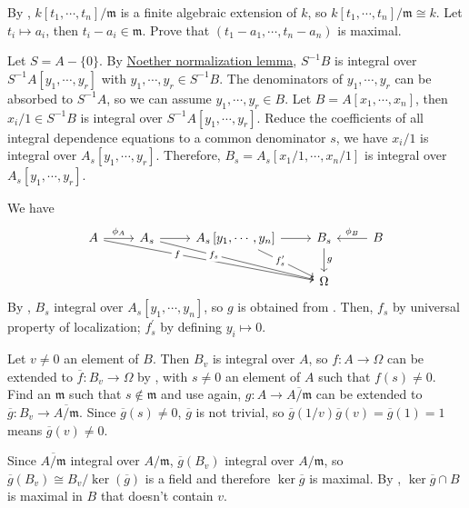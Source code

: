 \begin{exercise}\label{ex5.19}
	By , $k\left[t_1,\cdots,t_n\right]/\mathfrak{m}$ is a finite algebraic extension of $k$, so $k\left[t_1,\cdots,t_n\right]/\mathfrak{m}\cong k$. Let $t_i\mapsto a_i$, then $t_i-a_i\in\mathfrak{m}$. Prove that $\left(t_1-a_1,\cdots,t_n-a_n\right)$ is maximal.
\end{exercise}

\begin{exercise}\label{ex5.20}
	Let $S=A-\{0\}$. By \hyperref[noethernormalization]{Noether normalization lemma}, $S^{-1}B$ is integral over $S^{-1}A\left[y_1,\cdots,y_r\right]$ with $y_1,\cdots,y_r\in S^{-1}B$. The denominators of $y_1,\cdots,y_r$ can be absorbed to $S^{-1}A$, so we can assume $y_1,\cdots,y_r\in B$. Let $B=A\left[x_1,\cdots,x_n\right]$, then $x_i/1\in S^{-1}B$ is integral over $S^{-1}A\left[y_1,\cdots,y_r\right]$. Reduce the coefficients of all integral dependence equations to a common denominator $s$, we have $x_i/1$ is integral over $A_s\left[y_1,\cdots,y_r\right]$. Therefore, $B_s=A_s\left[x_1/1,\cdots,x_n/1\right]$ is integral over $A_s\left[y_1,\cdots,y_r\right]$.
\end{exercise}

\begin{exercise}\label{ex5.21}
	We have
	\begin{equation*}
		\begin{tikzcd}
			A\arrow[r,"\phi_A"]\arrow[drrr,"f"{description,pos=0.35}]&A_s\arrow[r]\arrow[drr,"f_s"{description,pos=0.35}]&A_s\left[y_1,\cdots,y_n\right]\arrow[r]\arrow[dr,"f_s^\prime"{description,pos=0.4}]
			&B_s\arrow[d,"g"]&B\arrow[l,"\phi_B"']\\
			&&&\Omega&
		\end{tikzcd}
	\end{equation*}
	By , $B_s$ integral over $A_s\left[y_1,\cdots,y_n\right]$, so $g$ is obtained from . Then, $f_s$ by universal property of localization; $f_s^\prime$ by defining $y_i\mapsto0$. 
\end{exercise}

\begin{exercise}\label{ex5.22}
	Let $v\neq0$ an element of $B$. Then $B_v$ is integral over $A$, so $f:A\rightarrow\Omega$ can be extended to $\overline{f}:B_v\rightarrow\Omega$ by , with $s\neq0$ an element of $A$ such that $f(s)\neq0$. Find an $\mathfrak{m}$ such that $s\notin\mathfrak{m}$ and use  again, $g:A\rightarrow\overline{A/\mathfrak{m}}$ can be extended to $\overline{g}:B_v\rightarrow\overline{A/\mathfrak{m}}$. Since $\overline{g}(s)\neq0$, $\overline{g}$ is not trivial, so $\overline{g}(1/v)\overline{g}(v)=\overline{g}(1)=1$ means $\overline{g}(v)\neq0$.
	
	Since $\overline{A/\mathfrak{m}}$ integral over $A/\mathfrak{m}$, $\overline{g}\left(B_v\right)$ integral over $A/\mathfrak{m}$, so $\overline{g}\left(B_v\right)\cong B_v/\ker\left(\overline{g}\right)$ is a field and therefore $\ker\overline{g}$ is maximal. By , $\ker\overline{g}\cap B$ is maximal in $B$ that doesn't contain $v$.
\end{exercise}

